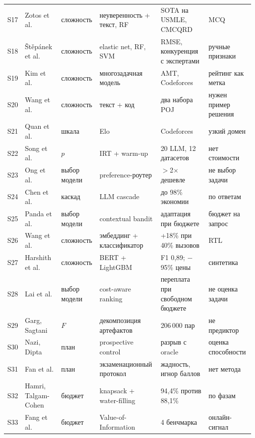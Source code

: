 \documentclass[11pt,a4paper]{article}
\begin{document}
{\begin{longtable}{@{}p{0.7cm}p{3.0cm}p{2.2cm}p{3.1cm}p{3.5cm}p{2.3cm}@{}}
S17 & Zotos et al. \cite{zotos2024doubtful} & сложность & неуверенность + текст, RF & SOTA на USMLE, CMCQRD & MCQ \\
S18 & Štěpánek et al. \cite{stepanek2023item} & сложность & elastic net, RF, SVM & RMSE, конкуренция с экспертами & ручные признаки \\
S19 & Kim et al. \cite{kim2023problem} & сложность & многозадачная модель & AMT, Codeforces & рейтинг как метка \\
S20 & Wang et al. \cite{wang2024estimating} & сложность & текст + код & два набора POJ & нужен пример решения \\
S21 & Quan et al. \cite{quan2025codeelo} & шкала & Elo & Codeforces & узкий домен \\
S22 & Song et al. \cite{song2025irtrouter} & $p$ & IRT + warm-up & 20 LLM, 12 датасетов & нет стоимости \\
S23 & Ong et al. \cite{ong2024routellm} & выбор модели & preference-роутер & $>$2$\times$ дешевле & не выбор задачи \\
S24 & Chen et al. \cite{chen2023frugalgpt} & каскад & LLM cascade & до 98\% экономии & по ответам \\
S25 & Panda et al. \cite{panda2025adaptive} & выбор модели & contextual bandit & адаптация при бюджете & бюджет на запрос \\
S26 & Wang et al. \cite{wang2025veridispatcher} & сложность & эмбеддинг + классификатор & +18\% при 40\% вызовов & RTL \\
S27 & Harshith et al. \cite{harshith2025cost} & сложность & BERT + LightGBM & F1 0{,}89; $-\,$95\% цены & синтетика \\
S28 & Lai et al. \cite{lai2026overpay} & выбор модели & cost-aware ranking & переплата при свободном бюджете & не оценка задачи \\
S29 & Garg, Sagtani \cite{garg2026unsolvability} & $F$ & декомпозиция артефактов & 206\,000 пар & не предиктор \\
S30 & Nazi, Dipta \cite{nazi2026triage} & план & prospective control & разрыв с oracle & оценка способности \\
S31 & Fan et al. \cite{fan2026thinking} & план & экзаменационный протокол & жадность, игнор баллов & нет метода \\
S32 & Hamri, Talgam-Cohen \cite{hamri2026zebra} & бюджет & knapsack + water-filling & 94{,}4\% против 88{,}1\% & по фазам \\
S33 & Fang et al. \cite{fang2026voi} & бюджет & Value-of-Information & 4 бенчмарка & онлайн-сигнал \\

\end{longtable}}
\end{document}
